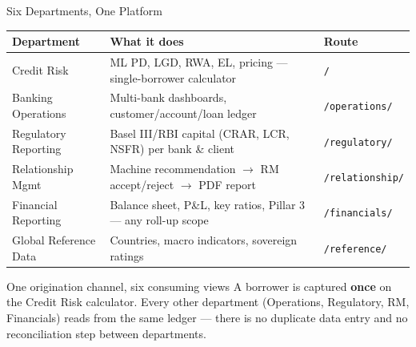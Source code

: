 \documentclass[9pt,aspectratio=169]{beamer}
\begin{document}
\begin{frame}{Six Departments, One Platform}
\vspace{-2pt}
\begin{center}
\footnotesize
\setlength{\tabcolsep}{5pt}
\begin{tabular}{lp{7.6cm}l}
  \toprule
  \textbf{Department} & \textbf{What it does} & \textbf{Route}\\
  \midrule
  Credit Risk            & ML PD, LGD, RWA, EL, pricing --- single-borrower calculator     & \texttt{/}\\
  Banking Operations     & Multi-bank dashboards, customer/account/loan ledger              & \texttt{/operations/}\\
  Regulatory Reporting   & Basel III/RBI capital (CRAR, LCR, NSFR) per bank \& client        & \texttt{/regulatory/}\\
  Relationship Mgmt      & Machine recommendation $\to$ RM accept/reject $\to$ PDF report    & \texttt{/relationship/}\\
  Financial Reporting    & Balance sheet, P\&L, key ratios, Pillar 3 --- any roll-up scope   & \texttt{/financials/}\\
  Global Reference Data  & Countries, macro indicators, sovereign ratings                    & \texttt{/reference/}\\
  \bottomrule
\end{tabular}
\end{center}
\vspace{6pt}
\begin{alertblock}{One origination channel, six consuming views}
  \footnotesize
  A borrower is captured \textbf{once} on the Credit Risk calculator. Every other department
  (Operations, Regulatory, RM, Financials) reads from the same ledger --- there is no
  duplicate data entry and no reconciliation step between departments.
\end{alertblock}
\end{frame}
\end{document}
